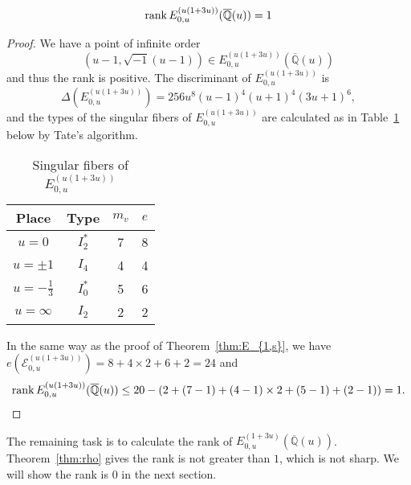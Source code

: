 \documentclass[main]{subfiles}
\begin{document}
\begin{thm}
    \begin{equation*}
        \operatorname{rank} E_{0,u}^{(u(1 + 3u))}(\overline{\mathbb{Q}}(u)) = 1
    \end{equation*}
\end{thm}
\begin{proof}
    We have a point of infinite order
    \begin{equation*}
        (u - 1, \sqrt{-1}(u - 1)) \in E_{0,u}^{(u(1 + 3u))}(\overline{\mathbb{Q}}(u))
    \end{equation*}
    and thus the rank is positive.
    The discriminant of $E_{0,u}^{(u(1 + 3u))}$ is
    \begin{equation*}
        \Delta(E_{0,u}^{(u(1 + 3u))}) = 256u^{8}(u - 1)^{4}(u + 1)^{4}(3u + 1)^{6},
    \end{equation*}
    and the types of the singular fibers of $E_{0,u}^{(u(1 + 3u))}$ are calculated as in Table~\ref{tab:E_{0,u}^{(u(1 + 3u))}} below by Tate's algorithm.
    \begin{table}[ht]
        \centering
        \caption{Singular fibers of $E_{0,u}^{(u(1 + 3u))}$}
        \begin{tabular}{|c|c|c|c|}
            \hline
            Place            & Type    & $m_v$ & $e$ \\
            \hline
            $u=0$            & $I_2^*$ & 7     & 8   \\
            $u=\pm 1$        & $I_4$   & 4     & 4   \\
            $u=-\frac{1}{3}$ & $I_0^*$ & 5     & 6   \\
            $u=\infty$       & $I_2$   & 2     & 2   \\
            \hline
        \end{tabular}
        \label{tab:E_{0,u}^{(u(1 + 3u))}}
    \end{table}
    In the same way as the proof of Theorem~\ref{thm:E_{1,s}}, we have $e(\mathcal{E}_{0,u}^{(u(1 + 3u))}) = 8 + 4 \times 2 + 6 + 2 = 24$ and
    \begin{equation*}
        \operatorname{rank} E_{0,u}^{(u(1 + 3u))}(\overline{\mathbb{Q}}(u)) \leq 20 - (2 + (7 - 1) + (4 - 1) \times 2 + (5 - 1) + (2 - 1)) = 1.
    \end{equation*}
\end{proof}

The remaining task is to calculate the rank of $E_{0,u}^{(1 + 3u)}(\overline{\mathbb{Q}}(u))$.
Theorem~\ref{thm:rho} gives the rank is not greater than $1$, which is not sharp.
We will show the rank is $0$ in the next section.
\end{document}
